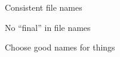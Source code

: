 \documentclass[aspectratio=169,12pt,t]{beamer}
\begin{document}
\begin{frame}[c]{}

  \centering

{
\setlength{\fboxsep}{0pt}
\setlength{\fboxrule}{1pt}

\begin{minipage}{0.7\textwidth}


\end{minipage}
}

  \note{

  }

\end{frame}






\begin{frame}[c]{Consistent file names}



  \note{

  }

\end{frame}



\begin{frame}[c]{No ``{\hilit final}'' in file names}

\vspace*{3mm}

\centering



\end{frame}




\begin{frame}[c]{Choose good names for things}



  \note{

  }

\end{frame}
\end{document}
